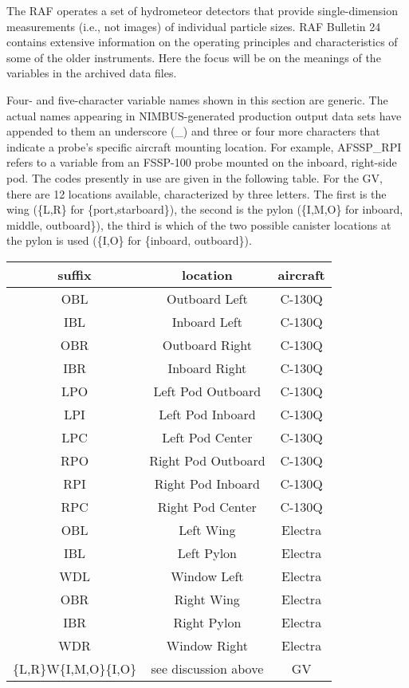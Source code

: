 \documentclass[
]{book}
\begin{document}
The RAF operates a set of hydrometeor detectors that provide single-dimension measurements (i.e., not images) of individual particle sizes. RAF Bulletin 24 contains extensive information on the operating principles and characteristics of some of the older instruments. Here the focus will be on the meanings of the variables in the archived data files.

\protect\hypertarget{VariableNames1DProbes}{}{}Four- and five-character variable names shown in this section are generic. The actual names appearing in NIMBUS-generated production output data sets have appended to them an underscore (\_) and three or four more characters that indicate a probe's specific aircraft mounting location. For example, AFSSP\_RPI refers to a variable from an FSSP-100 probe mounted on the inboard, right-side pod. The codes presently in use are given in the following table. For the GV, there are 12 locations available, characterized by three letters. The first is the wing (\{L,R\} for \{port,starboard\}), the second is the pylon (\{I,M,O\} for inboard, middle, outboard\}), the third is which of the two possible canister locations at the pylon is used (\{I,O\} for \{inboard, outboard\}).

\begin{table}
\centering
\begin{tabular}{c|c|c}
\hline
suffix & location & aircraft\\
\hline
OBL & Outboard Left & C-130Q\\
\hline
IBL & Inboard Left & C-130Q\\
\hline
OBR & Outboard Right & C-130Q\\
\hline
IBR & Inboard Right & C-130Q\\
\hline
LPO & Left Pod Outboard & C-130Q\\
\hline
LPI & Left Pod Inboard & C-130Q\\
\hline
LPC & Left Pod Center & C-130Q\\
\hline
RPO & Right Pod Outboard & C-130Q\\
\hline
RPI & Right Pod Inboard & C-130Q\\
\hline
RPC & Right Pod Center & C-130Q\\
\hline
OBL & Left Wing & Electra\\
\hline
IBL & Left Pylon & Electra\\
\hline
WDL & Window Left & Electra\\
\hline
OBR & Right Wing & Electra\\
\hline
IBR & Right Pylon & Electra\\
\hline
WDR & Window Right & Electra\\
\hline
\{L,R\}W\{I,M,O\}\{I,O\} & see discussion above & GV\\
\hline
\end{tabular}
\end{table}
\end{document}
